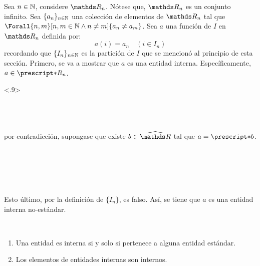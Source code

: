 \begin{demo}
  Sea $n\in\mathbb{N}$, considere $\R_n$. Nótese que, $\R_n$ es un conjunto
  infinito. Sea $\{a_n\}_{n\in\mathbb{N}}$ una colección de elementos de $\R_n$
  tal que $\Forall{n,m}[n,m\in\N \land n\not= m]{a_n \not= a_m}$.
  Sea $a$ una función de $I$ en $\R_n$ definida por:
  \[a(i) = a_n \quad (i\in I_n)\]
  recordando que $\{I_n\}_{n\in\mathbb{N}}$ es la partición de $I$ que se
  mencionó al principio de esta sección. Primero, se va a mostrar que
  $a$ es una entidad interna. Específicamente, $a\in\st{R_n}$.
  \begin{longderivation}<.9>
      \\
    \equiv\\
      \\
    \equiv\\
  \end{longderivation}

  por contradicción, supongase que existe $b\in\Rh$ tal que $a=\st{b}$.
  \begin{longderivation}
      \\
    \equiv\\
      \\
    \\
  \end{longderivation}
  Esto último, por la definición de $\{I_n\}$, es falso. Así, se tiene
  que $a$ es una entidad interna no-estándar.
\end{demo}

\begin{theorem}~
  \begin{enumerate}
    \item Una entidad es interna si y solo si pertenece a alguna
          entidad estándar.
    \item Los elementos de entidades internas son internos.
  \end{enumerate}
\end{theorem}

